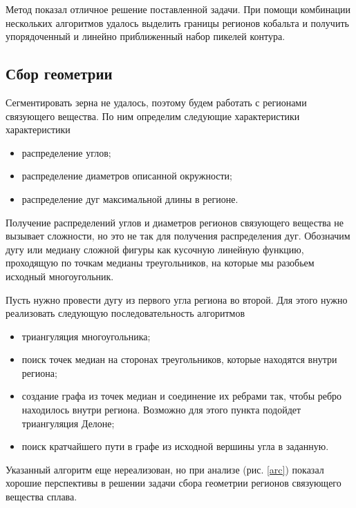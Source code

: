 \documentclass[a4paper, 14pt]{article}
\begin{document}
	Метод показал отличное решение поставленной задачи. При помощи комбинации нескольких алгоритмов удалось выделить границы регионов кобальта и получить упорядоченный и линейно приближенный набор пикелей контура.  
	

	
	
	\subsection{Сбор геометрии}
	
	Сегментировать зерна не удалось, поэтому будем работать с регионами связующего вещества. По ним определим следующие характеристики характеристики
	\begin{itemize}
		\item распределение углов;
		
		\item распределение диаметров описанной окружности;
		
		\item распределение дуг максимальной длины в регионе.
	\end{itemize}
	
	Получение распределений углов и диаметров регионов связующего вещества не вызывает сложности, но это не так для получения распределения дуг. 
	Обозначим дугу или медиану сложной фигуры как кусочную линейную функцию, проходящую по точкам медианы треугольников, на которые мы разобьем исходный многоугольник. 
	
	Пусть нужно провести дугу из первого угла региона во второй. Для этого нужно реализовать следующую последовательность алгоритмов 
	\begin{itemize}
		\item триангуляция многоугольника;
		
		\item поиск точек медиан на сторонах треугольников, которые находятся внутри региона;
		
		\item создание графа из точек медиан и соединение их ребрами так, чтобы ребро находилось внутри региона. Возможно  для этого пункта подойдет триангуляция Делоне;
		
		\item поиск кратчайшего пути в графе из исходной вершины угла в заданную.
	\end{itemize}
	
	Указанный алгоритм еще нереализован, но при анализе (рис. \ref{arc}) показал хорошие перспективы в решении задачи сбора геометрии регионов связующего вещества сплава.
	
\end{document}
